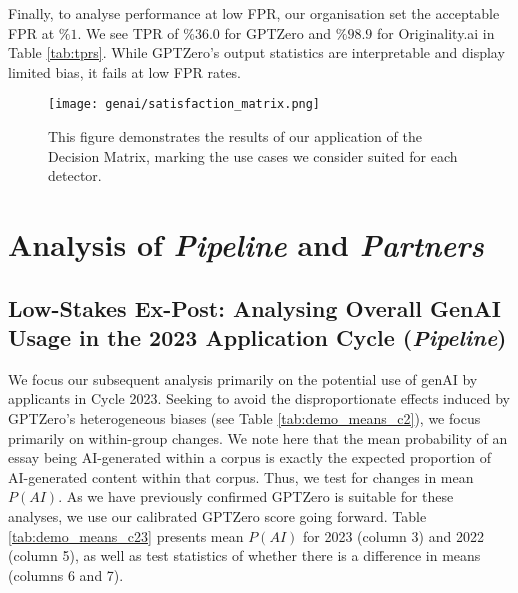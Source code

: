 Finally, to analyse performance at low FPR, our organisation set the acceptable FPR at $\%1$. We see TPR of $\%36.0$ for GPTZero and $\%98.9$ for Originality.ai in Table \ref{tab:tprs}. While GPTZero's output statistics are interpretable and display limited bias, it fails at low FPR rates.

\begin{figure}[htbp]
  \centering
  \texttt{[image: genai/satisfaction\_matrix.png]}
  \caption{This figure demonstrates the results of our application of the Decision Matrix, marking the use cases we consider suited for each detector.}
  \label{fig:satisfaction_matrix}
\end{figure}

\section{Analysis of \emph{Pipeline} and \emph{Partners}}\label{ssec:decisions}

\subsection{Low-Stakes Ex-Post: Analysing Overall GenAI Usage in the 2023 Application Cycle (\emph{Pipeline})}
We focus our subsequent analysis primarily on the potential use of genAI by applicants in Cycle 2023. Seeking to avoid the disproportionate effects induced by GPTZero's heterogeneous biases (see Table \ref{tab:demo_means_c2}), we focus primarily on within-group changes. We note here that the mean probability of an essay being AI-generated within a corpus is exactly the expected proportion of AI-generated content within that corpus. Thus, we test for changes in mean $P(AI)$. As we have previously confirmed GPTZero is suitable for these analyses, we use our calibrated GPTZero score going forward. Table \ref{tab:demo_means_c23} presents mean $P(AI)$ for 2023 (column 3) and 2022 (column 5), as well as test statistics of whether there is a difference in means (columns 6 and 7). 

